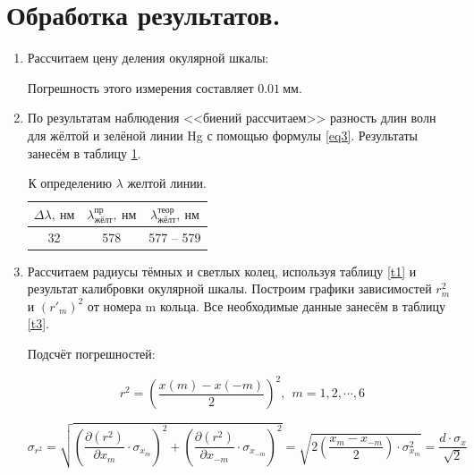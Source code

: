 \documentclass[a4paper, 12pt, twoside]{article}
\begin{document}
	

	\section{Обработка результатов.}
	\begin{enumerate}
		\item 	Рассчитаем цену деления окулярной шкалы:
			\begin{center}
			\end{center}
		
			Погрешность этого измерения составляет $0.01~\text{мм}$.
			
		\item  По результатам наблюдения <<биений рассчитаем>> разность длин волн для жёлтой и зелёной линии Hg с помощью формулы \eqref{eq3}. Результаты занесём в таблицу \ref{t2}.
		
		\begin{table}[H]
			\centering
			\caption{К определению $\lambda$ желтой линии.}
			\label{t2}
			\begin{tabular}{c|c|c} \toprule
				$\Delta \lambda,~\text{нм}$ & $\lambda_\text{жёлт}^{\text{пр}},~\text{нм}$ & $\lambda_\text{жёлт}^{\text{теор}},~\text{нм}$ \\ \midrule
				32                          & 578                                          & 577 -- 579     \\ \bottomrule                               
			\end{tabular}
		\end{table}
		
		\item 	Рассчитаем радиусы тёмных и светлых колец, используя таблицу \ref{t1} и результат калибровки окулярной шкалы. Построим графики зависимостей $r_m^2$ и $(r'_m)^2$ от номера m кольца. Все необходимые данные занесём в таблицу \ref{t3}.
		
		Подсчёт погрешностей:
		
		$$r^2 = \left ( \dfrac{x(m) - x(-m)}{2} \right )^2,~~m = 1, 2, \cdots, 6$$
		
		$$\sigma_{r^2} = \sqrt{\left (\frac{\partial (r^2)}{\partial x_m}\cdot \sigma_{x_m} \right )^2 + \left (\frac{\partial (r^2)}{\partial x_{-m}}\cdot \sigma_{x_{-m}} \right )^2} = \sqrt{2\left (\frac{x_m - x_{-m}}{2}\right ) \cdot \sigma_{x_m}^2} = \dfrac{d\cdot \sigma_x}{\sqrt{2}}$$
		

\end{enumerate}
\end{document}
